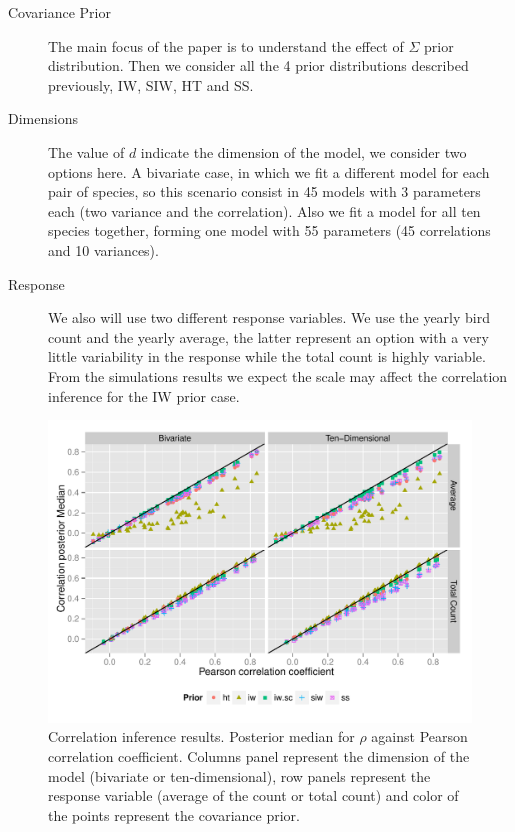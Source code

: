 \documentclass{article}
\begin{document}
\begin{description}
\item[Covariance Prior] The main focus of the paper is to understand the effect of  $\Sigma$ prior distribution. Then we consider all the 4 prior distributions described previously, IW, SIW, HT and SS. 

\item[ Dimensions] The value of $d$ indicate the dimension of the model, we consider two options here. A bivariate case, in which we fit a different model for each pair of species, so this scenario consist in 45 models with 3 parameters each (two variance and the correlation). Also we fit a model for all ten species together, forming one model with 55 parameters (45 correlations and 10 variances). 

\item[Response] We also will use two different response variables. We use the yearly bird count and the yearly average, the latter represent an option with a very little variability in the response while the total count is highly variable. From the simulations results we expect the scale may affect the correlation inference for the IW prior case. 
\end{description}

\begin{figure}[hbpt]
\centering
\includegraphics[width=\textwidth]{rescor}
 \vspace{-.5in}
\caption{Correlation inference results. Posterior median for $\rho$  against Pearson correlation coefficient. 
Columns panel represent the dimension of the model (bivariate or ten-dimensional), row panels represent the response variable (average of the count or total count)  and color of the points represent the covariance prior. \label{fig:coring}  }
\end{figure}
\end{document}
